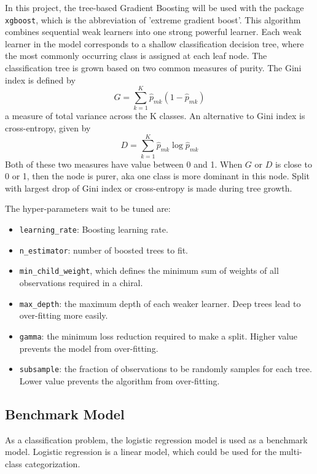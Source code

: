 \documentclass[12pt]{article}
\begin{document}
In this project, the tree-based Gradient Boosting will be used with the package \verb|xgboost|, which is the abbreviation of 'extreme gradient boost'. This algorithm combines sequential weak learners into one strong powerful learner. Each weak learner in the model corresponds to a shallow classification decision tree, where the most commonly occurring class is assigned at each leaf node.
The classification tree is grown based on two common measures of purity. 
The Gini index is defined by 
\begin{equation}
G = \sum_{k=1}^K\hat{p}_{mk}(1-\hat{p}_{mk})
\end{equation}
a measure of total variance across the K classes.
An alternative to Gini index is cross-entropy, given by
\begin{equation}
D = \sum_{k=1}^K\hat{p}_{mk}\log\hat{p}_{mk}
\end{equation}
Both of these two measures have value between 0 and 1. When $G$ or $D$ is close to 0 or 1, then the node is purer, aka one class is more dominant in this node. Split with largest drop of Gini index or cross-entropy is made during tree growth.

The hyper-parameters wait to be tuned are:

\begin{itemize}
\item \verb|learning_rate|: Boosting learning rate.
\item \verb|n_estimator|: number of boosted trees to fit.
\item \verb|min_child_weight|, which defines the minimum sum of weights of all observations required in a chiral.
\item \verb|max_depth|: the maximum depth of each weaker learner. Deep trees lead to over-fitting more easily.
\item \verb|gamma|: the minimum loss reduction required to make a split. Higher value prevents the model from over-fitting.
\item \verb|subsample|: the fraction of observations to be randomly samples for each tree. Lower value prevents the algorithm from over-fitting.
\end{itemize}


\subsection{Benchmark Model}
As a classification problem, the logistic regression model is used as a benchmark model. Logistic regression is a linear model, which could be used for the multi-class categorization. 
\end{document}
